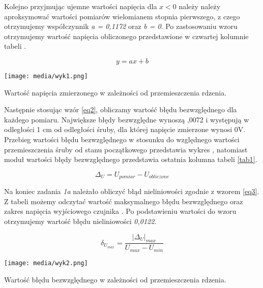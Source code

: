 \documentclass{article}
\begin{document}
\vspace{1em}
Kolejno przyjmując ujemne wartości napięcia dla $x < 0$ należy należy aproksymować wartości pomiarów wielomianem stopnia pierwszego, z czego otrzymujemy współczynnik \textit{a = 0,1172} oraz \textit{b = 0}.  Po zastosowaniu wzoru  otrzymujemy wartość napięcia obliczonego przedstawione w czwartej kolumnie tabeli . 

\begin{equation} \label{eq1}
    y = ax + b
\end{equation}
\newpage



\begin{graph}[ht]
    \centering
    \texttt{[image: media/wyk1.png]}
    \caption{Wartość napięcia zmierzonego w zależności od przemieszczenia rdzenia.}
    \label{wyk1}
\end{graph}

Następnie stosując wzór \ref{eq2}, obliczamy wartość błędu bezwzględnego dla każdego pomiaru. Największe błędy bezwzględne wynoszą ,0072 i występują w odległości 1 cm od odległości śruby, dla której napięcie zmierzone wynosi 0V. Przebieg wartości błędu bezwzględnego w stosunku do względnego wartości przemieszczenia śruby od stanu początkowego przedstawia wykres , natomiast moduł wartości błędy bezwzględnego przedstawia ostatnia kolumna tabeli \ref{tab1}.


\begin{equation} \label{eq2}
    \Delta_U = U_{pomiar} - U_{obliczone}
\end{equation}


\newpage
Na koniec zadania \textit{1a} należało obliczyć błąd nieliniowości zgodnie z wzorem \ref{eq3}. Z tabeli możemy odczytać wartość maksymalnego błędu bezwzględnego oraz zakres napięcia wyjściowego czujnika . Po podstawieniu wartości do wzoru otrzymujemy wartość błędu nieliniowości \textit{0,0122}.


\begin{equation} \label{eq3}
    \delta_{U_{max}} = \frac{|\Delta_U|_{max}}{U_{max} - U_{min}}
\end{equation}

\begin{graph}[ht]
    \centering
    \texttt{[image: media/wyk2.png]}
    \caption{Wartość błędu bezwzględnego w zależności od przemieszczenia rdzenia.}
    \label{wyk2}
\end{graph}
\end{document}
